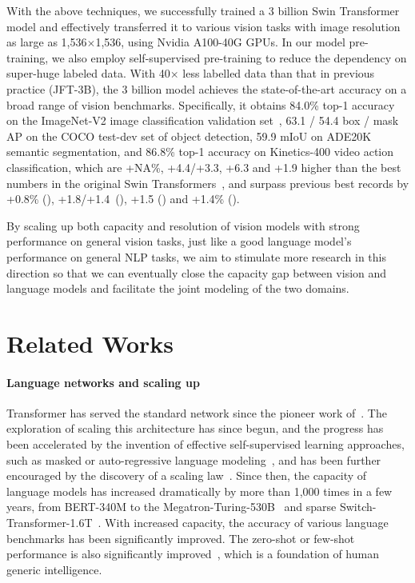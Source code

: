 \documentclass[10pt,twocolumn,letterpaper]{article}
\begin{document}
With the above techniques, we successfully trained a 3 billion Swin Transformer model and effectively transferred it to various vision tasks with image resolution as large as 1,536$\times$1,536, using Nvidia A100-40G GPUs. In our model pre-training, we also employ self-supervised pre-training to reduce the dependency on super-huge labeled data. With 40$\times$ less labelled data than that in previous practice (JFT-3B), the 3 billion model achieves the state-of-the-art accuracy on a broad range of vision benchmarks. Specifically, it obtains 84.0\% top-1 accuracy on the ImageNet-V2 image classification validation set~\cite{recht2019imagenet}, 63.1 / 54.4 box / mask AP on the COCO test-dev set of object detection, 59.9 mIoU on ADE20K semantic segmentation, and 86.8\% top-1 accuracy on Kinetics-400 video action classification, which are +NA\%, +4.4/+3.3, +6.3 and +1.9 higher than the best numbers in the original Swin Transformers~\cite{liu2021swin,liu2021video}, and surpass previous best records by +0.8\% (\cite{zhai2021scaling}), +1.8/+1.4~(\cite{xu2021endtoend}), +1.5 (\cite{bao2021beit}) and +1.4\% (\cite{ryoo2021tokenlearner}).

By scaling up both capacity and resolution of vision models with strong performance on general vision tasks, just like a good language model’s performance on general NLP tasks, we aim to stimulate more research in this direction so that we can eventually close the capacity gap between vision and language models and facilitate the joint modeling of the two domains.

\section{Related Works}

\paragraph{Language networks and scaling up} Transformer has served the standard network since the pioneer work of~\cite{vaswani2017attention}. The exploration of scaling this architecture has since begun, and the progress has been accelerated by the invention of effective self-supervised learning approaches, such as masked or auto-regressive language modeling~\cite{devlin2018bert,radford2019language}, and has been further encouraged by the discovery of a scaling law~\cite{kaplan2020scaling}. Since then, the capacity of language models has increased dramatically by more than 1,000 times in a few years, from BERT-340M to the Megatron-Turing-530B~\cite{raffel2019t5,Turing-17B,brown2020language,Megatron-Turing-530B} and sparse Switch-Transformer-1.6T~\cite{fedus2021switch}. With increased capacity, the accuracy of various language benchmarks has been significantly improved. The zero-shot or few-shot performance is also significantly improved~\cite{brown2020language}, which is a foundation of human generic intelligence.
\end{document}
